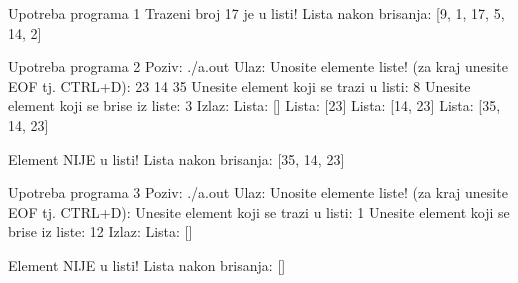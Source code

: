 \begin{Exercise}[label=601]
\begin{maxitest}
\begin{test}{Upotreba programa 1}
        Trazeni broj 17 je u listi!
        Lista nakon brisanja:  [9, 1, 17, 5, 14, 2]
\end{test}
\end{maxitest}



\begin{maxitest}
\begin{test}{Upotreba programa 2}
Poziv: ./a.out
Ulaz:
	Unosite elemente liste! (za kraj unesite EOF tj. CTRL+D): 23 14 35
	Unesite element koji se trazi u listi: 8
	Unesite element koji se brise iz liste: 3
Izlaz:
	Lista: []
        Lista: [23]
        Lista: [14, 23]
        Lista: [35, 14, 23]
        
        Element NIJE u listi!
        Lista nakon brisanja:  [35, 14, 23]
\end{test}
\end{maxitest}

\begin{maxitest}
\begin{test}{Upotreba programa 3}
Poziv: ./a.out
Ulaz:
	Unosite elemente liste! (za kraj unesite EOF tj. CTRL+D): 
	Unesite element koji se trazi u listi: 1
	Unesite element koji se brise iz liste: 12
Izlaz:
        Lista: []
        
        Element NIJE u listi!
        Lista nakon brisanja:  []
\end{test}
\end{maxitest}


\end{Exercise}

\begin{Answer}[ref=601]
\end{Answer}



